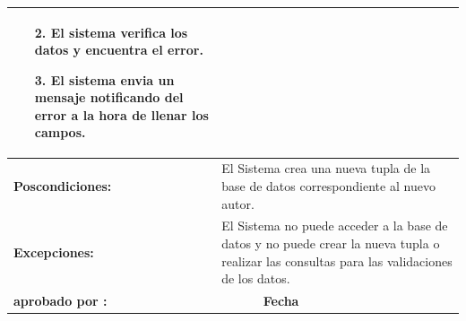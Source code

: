 \begin{center}
\begin{longtable}{|p{3cm}|p{3cm}|p{3cm}|p{3cm}|}
{\begin{itemize}
\item[2.] El sistema verifica los datos y encuentra el error.
\item[3.] El sistema envia un mensaje notificando del error a la hora de llenar los campos.
\end{itemize}}\\
\hline
\bf Poscondiciones: &\multicolumn{3}{|p{9cm}|}{El Sistema crea una nueva tupla de la base de datos correspondiente al nuevo autor.} \\
\hline
\bf Excepciones: &\multicolumn{3}{|p{9cm}|}{El Sistema no puede acceder a la base de datos y no puede crear la nueva tupla o realizar las consultas para las validaciones de los datos.} \\
\hline
\bf aprobado por : &   & \bf Fecha &  \\
\hline
\end{longtable}
\end{center}
% 

